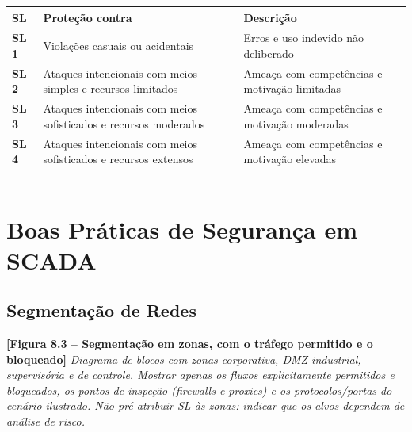 \begin{longtable}[]{@{}
  >{\raggedright\arraybackslash}p{}
  >{\raggedright\arraybackslash}p{}
  >{\raggedright\arraybackslash}p{}@{}}
\toprule\noalign{}
\begin{minipage}[b]{\linewidth}\raggedright
SL
\end{minipage} & \begin{minipage}[b]{\linewidth}\raggedright
Proteção contra
\end{minipage} & \begin{minipage}[b]{\linewidth}\raggedright
Descrição
\end{minipage} \\
\midrule\noalign{}
\endhead
\bottomrule\noalign{}
\endlastfoot
\textbf{SL 1} & Violações casuais ou acidentais & Erros e uso indevido não deliberado \\
\textbf{SL 2} & Ataques intencionais com meios simples e recursos limitados & Ameaça com competências e motivação limitadas \\
\textbf{SL 3} & Ataques intencionais com meios sofisticados e recursos moderados & Ameaça com competências e motivação moderadas \\
\textbf{SL 4} & Ataques intencionais com meios sofisticados e recursos extensos & Ameaça com competências e motivação elevadas \\
\end{longtable}

\begin{center}\rule{0.5\linewidth}{0.5pt}\end{center}

\section{Boas Práticas de Segurança em SCADA}\label{boas-pruxe1ticas-de-seguranuxe7a-em-scada}

\subsection{Segmentação de Redes}\label{segmentauxe7uxe3o-de-redes}

\begin{caixafigura}

\textbf{{[}Figura 8.3 -- Segmentação em zonas, com o tráfego permitido e o bloqueado{]}}
\emph{Diagrama de blocos com zonas corporativa, DMZ industrial, supervisória e de controle. Mostrar apenas os fluxos explicitamente permitidos e bloqueados, os pontos de inspeção (firewalls e proxies) e os protocolos/portas do cenário ilustrado. Não pré-atribuir SL às zonas: indicar que os alvos dependem de análise de risco.}

\end{caixafigura}

